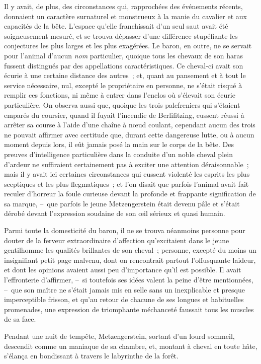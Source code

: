 \documentclass[french,twoside]{book} %
\begin{document}
Il y avait, de plus, des circonstances qui, rapprochées des événements récents, donnaient un caractère surnaturel et monstrueux à la manie du cavalier et aux capacités de la bête. L’espace qu’elle franchissait d’un seul saut avait été soigneusement mesuré, et se trouva dépasser d’une différence stupéfiante les conjectures les plus larges et les plus exagérées. Le baron, en outre, ne se servait pour l’animal d’aucun \emph{nom} particulier, quoique tous les chevaux de son haras fussent distingués par des appellations caractéristiques. Ce cheval-ci avait son écurie à une certaine distance des autres ; et, quant au pansement et à tout le service nécessaire, nul, excepté le propriétaire en personne, ne s’était risqué à remplir ces fonctions, ni même à entrer dans l’enclos où s’élevait son écurie particulière. On observa aussi que, quoique les trois palefreniers qui s’étaient emparés du coursier, quand il fuyait l’incendie de Berlifitzing, eussent réussi à arrêter sa course à l’aide d’une chaîne à nœud coulant, cependant aucun des trois ne pouvait affirmer avec certitude que, durant cette dangereuse lutte, ou à aucun moment depuis lors, il eût jamais posé la main sur le corps de la bête. Des preuves d’intelligence particulière dans la conduite d’un noble cheval plein d’ardeur ne suffiraient certainement pas à exciter une attention déraisonnable ; mais il y avait ici certaines circonstances qui eussent violenté les esprits les plus sceptiques et les plus flegmatiques ; et l’on disait que parfois l’animal avait fait reculer d’horreur la foule curieuse devant la profonde et frappante signification de sa marque, – que parfois le jeune Metzengerstein était devenu pâle et s’était dérobé devant l’expression soudaine de son œil sérieux et quasi humain.\par
Parmi toute la domesticité du baron, il ne se trouva néanmoins personne pour douter de la ferveur extraordinaire d’affection qu’excitaient dans le jeune gentilhomme les qualités brillantes de son cheval ; personne, excepté du moins un insignifiant petit page malvenu, dont on rencontrait partout l’offusquante laideur, et dont les opinions avaient aussi peu d’importance qu’il est possible. Il avait l’effronterie d’affirmer, – si toutefois ses idées valent la peine d’être mentionnées, – que son maître ne s’était jamais mis en selle sans un inexplicable et presque imperceptible frisson, et qu’au retour de chacune de ses longues et habituelles promenades, une expression de triomphante méchanceté faussait tous les muscles de sa face.\par
Pendant une nuit de tempête, Metzengerstein, sortant d’un lourd sommeil, descendit comme un maniaque de sa chambre, et, montant à cheval en toute hâte, s’élança en bondissant à travers le labyrinthe de la forêt.\par
\end{document}
